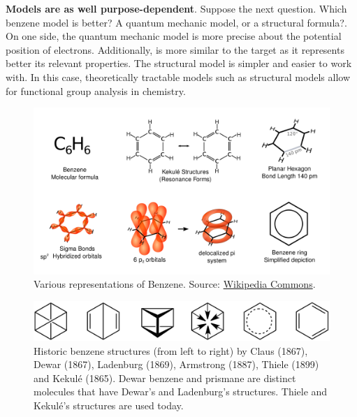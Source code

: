 \documentclass[
]{book}
\begin{document}
\textbf{Models are as well purpose-dependent}. Suppose the next question. Which benzene model is better? A quantum mechanic model, or a structural formula?. On one side, the quantum mechanic model is more precise about the potential position of electrons. Additionally, is more similar to the target as it represents better its relevant properties. The structural model is simpler and easier to work with. In this case, theoretically tractable models such as structural models allow for functional group analysis in chemistry.



\begin{figure}[hbtp]

{\centering \includegraphics[width=0.9\linewidth]{Figures/Benzene_Representations} 

}

\caption{Various representations of Benzene. Source: \href{https://en.wikipedia.org/wiki/File:Benzene_Representations.svg}{Wikipedia Commons}.}\label{fig:benzene-model}
\end{figure}



\begin{figure}[hbtp]

{\centering \includegraphics[width=0.9\linewidth]{Figures/Historic_Benzene_Formulae} 

}

\caption{Historic benzene structures (from left to right) by Claus (1867), Dewar (1867), Ladenburg (1869), Armstrong (1887), Thiele (1899) and Kekulé (1865). Dewar benzene and prismane are distinct molecules that have Dewar's and Ladenburg's structures. Thiele and Kekulé's structures are used today.}\label{fig:benzene-model-evolution}
\end{figure}
\end{document}
